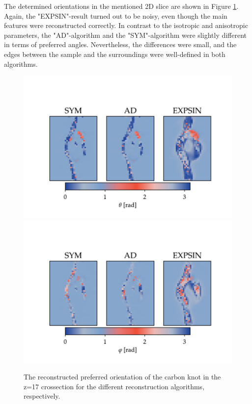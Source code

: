 \clearpage
The determined orientations in the mentioned 2D slice are shown in Figure \ref{fig:carbon_knot_reconstruction_2D_angles}. %
Again, the "EXPSIN"-result turned out to be noisy, even though the main features were reconstructed correctly.
In contrast to the isotropic and anisotropic parameters,
the "AD"-algorithm and the "SYM"-algorithm were slightly different in terms of preferred angles.
Nevertheless, the differences were small, and the edges between the sample and the surroundings were well-defined in both algorithms.

\begin{figure}[h!]
    \centering

    \includegraphics[trim = {0 0 0 2.0cm}, clip, width = 1\textwidth]{./svg-inkscape/ck_slices_theta_svg-tex.pdf}
    \includegraphics[trim = {0 0 0 2.0cm}, clip, width = 1\textwidth]{./svg-inkscape/ck_slices_phi_svg-tex.pdf}
    \caption{  The reconstructed preferred orientation of the carbon knot in the z=17 crossection for the different reconstruction algorithms, respectively. }
    \label{fig:carbon_knot_reconstruction_2D_angles}
\end{figure}




